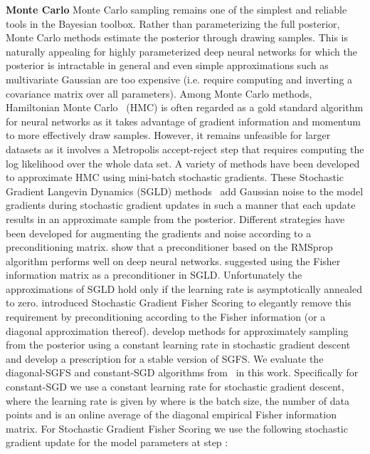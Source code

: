 \documentclass{article} \usepackage{iclr2018_conference,times}
\begin{document}
\textbf{Monte Carlo} Monte Carlo sampling remains one of the simplest and reliable tools in the Bayesian toolbox.  Rather than parameterizing the full posterior, Monte Carlo methods estimate the posterior through drawing samples.  This is naturally appealing for highly parameterized deep neural networks for which the posterior is intractable in general and even simple approximations such as multivariate Gaussian are too expensive (i.e. require computing and inverting a covariance matrix over all parameters).  Among Monte Carlo methods, Hamiltonian Monte Carlo~\citep{Neal1994} (HMC) is often regarded as a gold standard algorithm for neural networks as it takes advantage of gradient information and momentum to more effectively draw samples.  However, it remains unfeasible for larger datasets as it involves a Metropolis accept-reject step that requires computing the log likelihood over the whole data set.  A variety of methods have been developed to approximate HMC using mini-batch stochastic gradients.  These Stochastic Gradient Langevin Dynamics (SGLD) methods~\citep{Neal1994,WellingTeh2011} add Gaussian noise to the model gradients during stochastic gradient updates in such a manner that each update results in an approximate sample from the posterior. Different strategies have been developed for augmenting the gradients and noise according to a preconditioning matrix.  \cite{Li2016} show that a preconditioner based on the RMSprop algorithm performs well on deep neural networks.  \cite{Patterson2013} suggested using the Fisher information matrix as a preconditioner in SGLD.  Unfortunately the approximations of SGLD hold only if the learning rate is asymptotically annealed to zero. \cite{Ahn2013} introduced Stochastic Gradient Fisher Scoring to elegantly remove this requirement by preconditioning according to the Fisher information (or a diagonal approximation thereof).  \cite{Mandt2016} develop methods for approximately sampling from the posterior using a constant learning rate in stochastic gradient descent and develop a prescription for a stable version of SGFS.  We evaluate the diagonal-SGFS and constant-SGD algorithms from~\cite{Mandt2016} in this work.  Specifically for constant-SGD we use a constant learning rate for stochastic gradient descent, where the learning rate  is given by  where  is the batch size,  the number of data points and  is an online average of the diagonal empirical Fisher information matrix.  For Stochastic Gradient Fisher Scoring we use the following stochastic gradient update for the model parameters  at step :
\end{document}

